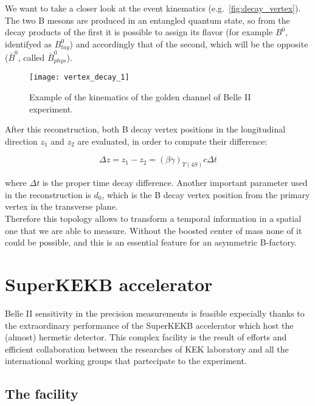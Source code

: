 We want to take a closer look at the event kinematics (e.g.~\autoref{fig:decay_vertex}). The two B mesons are produced in an entangled quantum state, so from the decay products of the first it is possible to assign its flavor (for example $B^{0}$, identifyed as $B_{tag}^{0}$) and accordingly that of the second, which will be the opposite ($\bar{B}^{0}$, called $\bar{B}_{phys}^{0}$).

\begin{figure}[h!]
\centering
\texttt{[image: vertex\_decay\_1]}
\caption{Example of the kinematics of the golden channel of Belle II experiment.}
\label{fig:decay_vertex}
\end{figure}

After this reconstruction, both B decay vertex positions in the longitudinal direction $\textit{z}_{1}$ and $\textit{z}_{2}$ are evaluated, in order to compute their difference:

\begin{equation}
\Delta \textit{z} = \textit{z}_{1} - \textit{z}_{2} = (\beta\gamma)_{\Upsilon(4S)}c\Delta t
\end{equation}

where $\Delta t$ is the proper time decay difference. 
Another important parameter used in the reconstruction is \textit{$d_{0}$}, which is the B decay vertex position from the primary vertex in the transverse plane.\\
Therefore this topology allows to transform a temporal information in a spatial one that we are able to measure. Without the boosted center of mass none of it could be possible, and this is an essential feature for an asymmetric B-factory. 


\section{SuperKEKB accelerator}

Belle II sensitivity in the precision measurements is feasible expecially thanks to the extraordinary performance of the SuperKEKB accelerator which host the (almost) hermetic detector. This complex facility is the result of efforts and efficient collaboration between the researches of KEK laboratory and all the international working groups that partecipate to the experiment.


\subsection{The facility}

